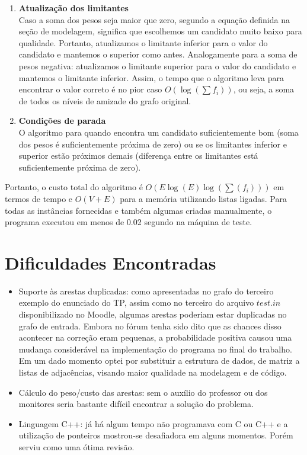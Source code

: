 \documentclass[a4paper,12pt,titlepage]{article}
\begin{document}
\begin{enumerate}
\item\textbf{Atualização dos limitantes} \\
Caso a soma dos pesos seja maior que zero, segundo a equação definida na seção de modelagem, significa que escolhemos um candidato muito baixo para qualidade. Portanto, atualizamos o limitante inferior para o valor do candidato e mantemos o superior como antes. Analogamente para a soma de pesos negativa: atualizamos o limitante superior para o valor do candidato e mantemos o limitante inferior.
Assim, o tempo que o algoritmo leva para encontrar o valor correto é no pior caso $O(\log(\sum{f_i}))$, ou seja, a soma de todos os níveis de amizade do grafo original.

\item\textbf{Condições de parada} \\
O algoritmo para quando encontra um candidato suficientemente bom (soma dos pesos é suficientemente próxima de zero) ou se os limitantes inferior e superior estão próximos demais (diferença entre os limitantes está suficientemente próxima de zero). 

\end{enumerate}

Portanto, o custo total do algoritmo é $O(E\log(E)\log(\sum({f_i})))$ em termos de tempo e $O(V + E)$ para a memória utilizando listas ligadas. Para todas as instâncias fornecidas e também algumas criadas manualmente, o programa executou em menos de 0.02 segundo na máquina de teste.

\section{Dificuldades Encontradas}

\begin{itemize}
\item {Suporte às arestas duplicadas:} como apresentadas no grafo do terceiro exemplo do enunciado do TP, assim como no terceiro do arquivo $test.in$ disponibilizado no Moodle, algumas arestas poderiam estar duplicadas no grafo de entrada. Embora no fórum tenha sido dito que as chances disso acontecer na correção eram pequenas, a probabilidade positiva causou uma mudança considerável na implementação do programa no final do trabalho. Em um dado momento optei por substituir a estrutura de dados, de matriz a listas de adjacências, visando maior qualidade na modelagem e de código.

\item {Cálculo do peso/custo das arestas:} sem o auxílio do professor ou dos monitores seria bastante difícil encontrar a solução do problema.

\item {Linguagem C++:} já há algum tempo não programava com C ou C++ e a utilização de ponteiros mostrou-se desafiadora em alguns momentos. Porém serviu como uma ótima revisão. 

\end{itemize}
\end{document}
